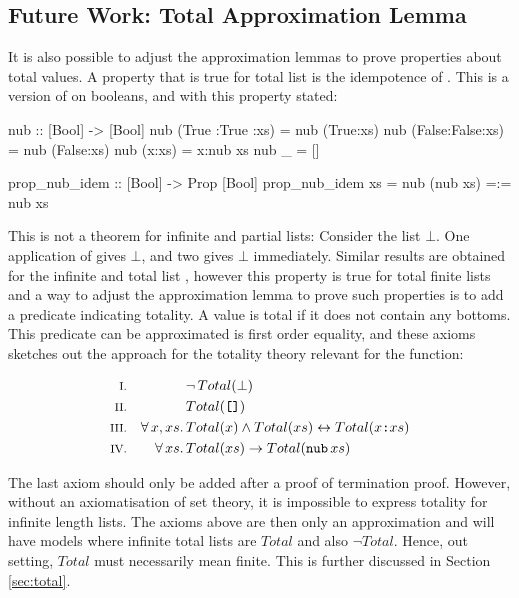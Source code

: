 \pagebreak

\subsection{Future Work: Total Approximation Lemma}
\label{sec:totalapprox}

It is also possible to adjust the approximation lemmas to prove
properties about total values. A property that is true for total list
is the idempotence of . This is a version of  on
booleans, and with this property stated:

\begin{code}
nub :: [Bool] -> [Bool]
nub (True :True :xs) = nub (True:xs)
nub (False:False:xs) = nub (False:xs)
nub (x:xs)           = x:nub xs
nub _                = []

prop_nub_idem :: [Bool] -> Prop [Bool]
prop_nub_idem xs = nub (nub xs) =:= nub xs
\end{code}

\noindent
This is not a theorem for infinite and partial lists: Consider the
list $\bot$. One application of  gives
$\bot$, and two gives $\bot$ immediately. Similar results
are obtained for the infinite and total list , however
this property is true for total finite lists and a way to adjust the
approximation lemma to prove such properties is to add a predicate
indicating totality. A value is total if it does not contain any
bottoms. This predicate can be approximated is first order equality,
and these axioms sketches out the approach for the totality theory
relevant for the  function:

\begin{align*}
\rom{1} &&             & \neg \, Total(\bot) \\
\rom{2} &&             & Total(\hs{[]}) \\
\rom{3} && \faa{x}{xs} & Total(x) \wedge Total(xs) \leftrightarrow Total(x\hs{:}xs) \\
\rom{4} && \fa{xs}     & Total(xs) \rightarrow Total(\hs{nub} \, xs) \\
\end{align*}

The last axiom should only be added after a proof of termination
proof. However, without an axiomatisation of set theory, it is
impossible to express totality for infinite length lists. The axioms
above are then only an approximation and will have models where
infinite total lists are $Total$ and also $\neg Total$. Hence, out
setting, $Total$ must necessarily mean finite. This is further
discussed in Section \ref{sec:total}.

